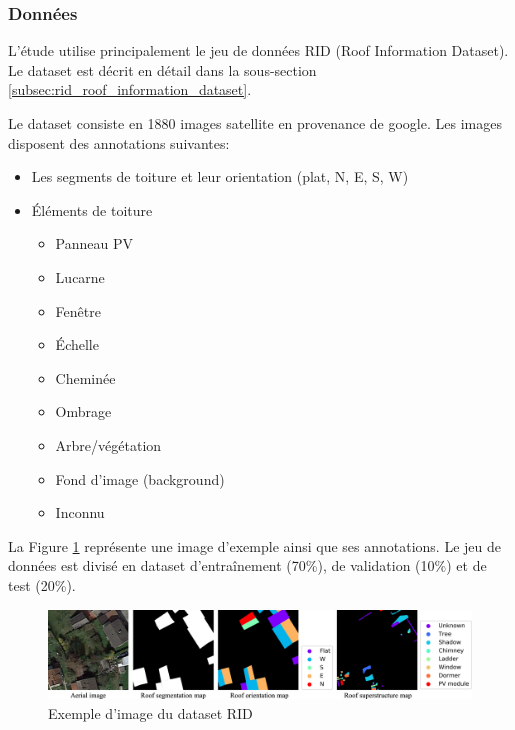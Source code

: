 \subsubsection{Données}
\par{L'étude utilise principalement le jeu de données RID (Roof Information Dataset). Le dataset est décrit en détail dans la sous-section \ref{subsec:rid_roof_information_dataset}.}
\par{Le dataset consiste en 1880 images satellite en provenance de google. Les images disposent des annotations suivantes:
\begin{itemize}
    \item Les segments de toiture et leur orientation (plat, N, E, S, W)
    \item Éléments de toiture
    \begin{itemize}
        \item Panneau PV
        \item Lucarne
        \item Fenêtre
        \item Échelle
        \item Cheminée
        \item Ombrage
        \item Arbre/végétation
        \item Fond d'image (background)
        \item Inconnu
    \end{itemize}
\end{itemize}}
\par{La Figure \ref{fig:rid_dataset_sample} représente une image d'exemple ainsi que ses annotations. Le jeu de données est divisé en dataset d'entraînement (70\%), de validation (10\%) et de test (20\%).}
\begin{figure}[H]
    \centering
        \includegraphics[width=1\linewidth]{02-main//figures/ch2/rid_dataset_sample.png}
    \caption{Exemple d'image du dataset RID \cite{li_deep_2024}}
    \label{fig:rid_dataset_sample}
\end{figure}

